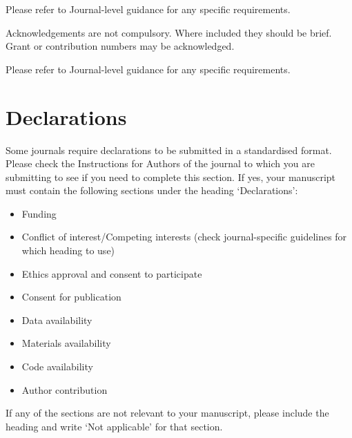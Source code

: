 \documentclass[pdflatex,sn-mathphys-num]{sn-jnl}%
\theoremstyle{thmstyleone}%
\theoremstyle{thmstyletwo}%
\theoremstyle{thmstylethree}%
\begin{document}
Please refer to Journal-level guidance for any specific requirements.


Acknowledgements are not compulsory. Where included they should be brief. Grant or contribution numbers may be acknowledged.

Please refer to Journal-level guidance for any specific requirements.

\section*{Declarations}

Some journals require declarations to be submitted in a standardised format. Please check the Instructions for Authors of the journal to which you are submitting to see if you need to complete this section. If yes, your manuscript must contain the following sections under the heading `Declarations':

\begin{itemize}
\item Funding
\item Conflict of interest/Competing interests (check journal-specific guidelines for which heading to use)
\item Ethics approval and consent to participate
\item Consent for publication
\item Data availability 
\item Materials availability
\item Code availability 
\item Author contribution
\end{itemize}

\noindent
If any of the sections are not relevant to your manuscript, please include the heading and write `Not applicable' for that section. 



\end{document}
